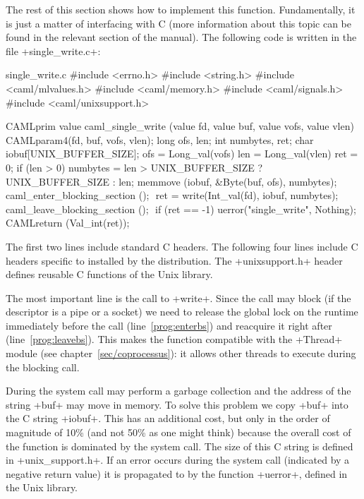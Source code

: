 The rest of this section shows how to implement this
function. Fundamentally, it is just a matter of interfacing {\ocaml} with
C (more information about this topic can be found in the relevant
section of the {\ocaml} manual). The following code is written in the file
\ml+single_write.c+:
%
\begin{listingcodefile}[style=numbers]{single_write.c}
#include <errno.h>
#include <string.h>
#include <caml/mlvalues.h>
#include <caml/memory.h>
#include <caml/signals.h>
#include <caml/unixsupport.h>

CAMLprim value caml_single_write
        (value fd, value buf, value vofs, value vlen) {
  CAMLparam4(fd, buf, vofs, vlen);
  long ofs, len;
  int numbytes, ret;
  char iobuf[UNIX_BUFFER_SIZE];
  ofs = Long_val(vofs)
  len = Long_val(vlen)
  ret = 0;
  if (len > 0) {
    numbytes = len > UNIX_BUFFER_SIZE ? UNIX_BUFFER_SIZE : len;
    memmove (iobuf, &Byte(buf, ofs), numbytes);
    caml_enter_blocking_section (); $\label{prog:enterbs}$
    ret = write(Int_val(fd), iobuf, numbytes);
    caml_leave_blocking_section (); $\label{prog:leavebs}$
    if (ret == -1) uerror("single_write", Nothing);
  }
  CAMLreturn (Val_int(ret));
}
\end{listingcodefile}
% 
The first two lines include standard C headers. The following four
lines include C headers specific to {\ocaml} installed by the
distribution. The \ml+unixsupport.h+ header defines reusable C
functions of the {\ocaml} Unix library.

The most important line is the call to \ml+write+. Since the call may
block (if the descriptor is a pipe or a socket) we need to release the
global lock on the {\ocaml} runtime immediately before the call
(line~\ref{prog:enterbs}) and reacquire it right after
(line~\ref{prog:leavebs}). This makes the function compatible with the
\ml+Thread+ module (see chapter~\ref{sec/coprocessus}): it allows
other threads to execute during the blocking call. 

During the system call {\ocaml} may perform a garbage collection and
the address of the {\ocaml} string \ml+buf+ may move in memory. To
solve this problem we copy \ml+buf+ into the C string \ml+iobuf+.
This has an additional cost, but only in the order of magnitude of
10\% (and not 50\% as one might think) because the overall cost of the
function is dominated by the system call. The size of this C string is
defined in \ml+unix_support.h+. If an error occurs during the system
call (indicated by a negative return value) it is propagated to
{\ocaml} by the function \ml+uerror+, defined in the {\ocaml} Unix library.

